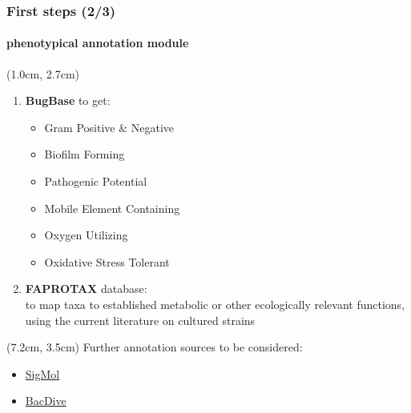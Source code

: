 \documentclass{beamer}
\begin{document}
   \begin{frame}
      \frametitle{First steps (2/3)}
      \framesubtitle{phenotypical annotation module}

      \begin{singlespace}
         
         \begin{textblock*}{10cm}(1.0cm, 2.7cm)
            

            \begin{enumerate}

               \setlength\itemsep{2em}


               \small \item \textbf{BugBase} to get: 
                  \begin{itemize}
                     \scriptsize \item Gram Positive \& Negative
                     \scriptsize \item Biofilm Forming
                     \scriptsize \item Pathogenic Potential
                     \scriptsize \item Mobile Element Containing
                     \scriptsize \item Oxygen Utilizing
                     \scriptsize \item Oxidative Stress Tolerant
                  \end{itemize}

               
               \small \item \textbf{FAPROTAX} database: \\
                     \scriptsize to map taxa to established metabolic or other ecologically relevant functions, using the current literature on cultured strains
            \end{enumerate}

         \end{textblock*}


         \begin{textblock*}{5cm}(7.2cm, 3.5cm)
            \small Further annotation sources to be considered: 
            \begin{itemize}
               \small \item \href{https://bioinfo.imtech.res.in/manojk/sigmol/}{SigMol}
               \small \item \href{https://api.bacdive.dsmz.de/}{BacDive}
            \end{itemize}
      
         \end{textblock*}

      \end{singlespace}

   \end{frame}
\end{document}
